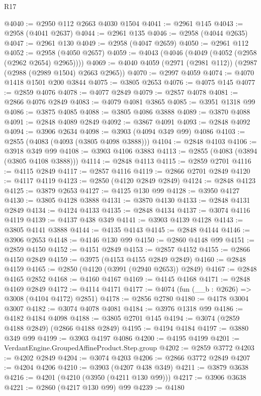 \begin{lexlean}{R17}
\begin{coremodule}
@4040 := @2950 @112 @2663 @4030 @1504
@4041 := @2961 @145
@4043 := @2958 (@4041 @2637)
@4044 := @2961 @135
@4046 := @2958 (@4044 @2635)
@4047 := @2961 @130
@4049 := @2958 (@4047 @2659)
@4050 := @2961 @112
@4052 := @2958 (@4050 @2657)
@4059 := @4043 (@4046 (@4049 (@4052 (@2958 (@2962 @2654) @2965))))
@4069 := @4040 @4059 (@2971 (@2981 @112)) (@2987 (@2988 (@2989 @1504) @2663 @2965))
@4070 := @2997 @4059
@4074 := @4070 @1418 @1501 @200 @3844
@4075 := @3805 @2653
@4076 := @4075 @145
@4077 := @2859 @4076
@4078 := @4077 @2849
@4079 := @2857 @4078
@4081 := @2866 @4076 @2849
@4083 := @4079 @4081 @3865
@4085 := @3951 @1318 @99
@4086 := @3875 @4085
@4088 := @3805 @4086 @3888
@4089 := @3870 @4088
@4091 := @2848 @4089 @2849
@4092 := @3867 @4091
@4093 := @2848 @4092
@4094 := @3906 @2634
@4098 := @3903 (@4094 @349 @99) @4086
@4103 := @2855 (@4083 (@4093 (@3805 @4098 @3888)))
@4104 := @2848 @4103
@4106 := @3918 @349 @99
@4108 := @3903 @4106 @3883
@4113 := @2855 (@4083 (@3894 (@3805 @4108 @3888)))
@4114 := @2848 @4113
@4115 := @2859 @2701
@4116 := @4115 @2849
@4117 := @2857 @4116
@4119 := @2866 @2701 @2849
@4120 := @4117 @4119
@4123 := @2850 (@4120 @2849 @2849)
@4124 := @2848 @4123
@4125 := @3879 @2653
@4127 := @4125 @130 @99
@4128 := @3950 @4127
@4130 := @3805 @4128 @3888
@4131 := @3870 @4130
@4133 := @2848 @4131 @2849
@4134 := @4124 @4133
@4135 := @2848 @4134
@4137 := @3074 @4116 @4119
@4139 := @4137 @438 @349
@4141 := @3903 @4139 @4128
@4143 := @3805 @4141 @3888
@4144 := @4135 @4143
@4145 := @2848 @4144
@4146 := @3906 @2653
@4148 := @4146 @130 @99
@4150 := @2860 @4148 @99
@4151 := @2859 @4150
@4152 := @4151 @2849
@4153 := @2857 @4152
@4155 := @2866 @4150 @2849
@4159 := @3975 (@4153 @4155 @2849 @2849)
@4160 := @2848 @4159
@4165 := @2850 (@4120 (@3991 (@2940 @2653)) @2849)
@4167 := @2848 @4165 @2852
@4168 := @4160 @4167
@4169 := @4145 @4168
@4171 := @2848 @4169 @2849
@4172 := @4114 @4171
@4177 := @4074 (fun (__b : @2626) => @3008 (@4104 @4172) @2851)
@4178 := @2856 @2780
@4180 := @4178 @3004 @3007
@4182 := @3074 @4078 @4081
@4184 := @3976 @1318 @99
@4186 := @4182 @4184 @4098
@4188 := @3805 @2701 @145
@4194 := @3074 (@2859 @4188 @2849) (@2866 @4188 @2849)
@4195 := @4194 @4184
@4197 := @3880 @349 @99
@4199 := @3903 @4197 @4086
@4200 := @4195 @4199
@4201 := VerdantEngine.GroupedAffineProduct.Step.group
@4202 := @2859 @3772
@4203 := @4202 @2849
@4204 := @3074 @4203
@4206 := @2866 @3772 @2849
@4207 := @4204 @4206
@4210 := @3903 (@4207 @438 @349)
@4211 := @3879 @3638
@4216 := @4201 (@4210 (@3950 (@4211 @130 @99)))
@4217 := @3906 @3638
@4221 := @2860 (@4217 @130 @99) @99
@4239 := @4180

\end{coremodule}
\end{lexlean}
